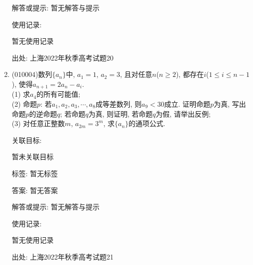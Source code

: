 \documentclass[10pt,a4paper]{article}
\begin{document}
\begin{enumerate}[1.]
解答或提示: 暂无解答与提示

使用记录:

暂无使用记录


出处: 上海2022年秋季高考试题20
\item { (010004)}数列$\{a_n\}$中, $a_1=1$, $a_2=3$, 且对任意$n$($n\ge 2$), 都存在$i$($1\le i\le n-1$), 使得$a_{n+1}=2a_n-a_i$.\\
(1) 求$a_4$的所有可能值;\\
(2) 命题$p$: 若$a_1,a_2,a_3,\cdots,a_8$成等差数列, 则$a_9<30$成立. 证明命题$p$为真, 写出命题$p$的逆命题$q$; 若命题$q$为真, 则证明, 若命题$q$为假, 请举出反例;\\
(3) 对任意正整数$m$, $a_{2m}=3^m$, 求$\{a_n\}$的通项公式.


关联目标:

暂未关联目标



标签: 暂无标签

答案: 暂无答案

解答或提示: 暂无解答与提示

使用记录:

暂无使用记录


出处: 上海2022年秋季高考试题21
\end{enumerate}
\end{document}
